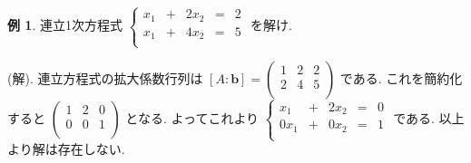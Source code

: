 \documentclass[dvipdfmx,a4paper,11pt]{article}
\theoremstyle{definition}
\newtheorem{exa}[thm]{例}
\begin{document}
\begin{exa}
連立1次方程式
 $
 \left\{ 
\begin{matrix}
x_1&+&2x_2& = &2 \\
x_1&+&4x_2& = &5\\
\end{matrix}
\right.
 $
 を解け.
 
 (解). 連立方程式の拡大係数行列は
 $[A:\bm{b}]=
  \begin{pmatrix}
 1& 2& 2  \\
 2& 4& 5  \\
 \end{pmatrix}
 $
 である. 
 これを簡約化すると
 $
  \begin{pmatrix}
 1& 2& 0  \\
 0& 0& 1 \\
 \end{pmatrix} 
 $
 となる. よってこれより
 $
  \left\{ 
\begin{matrix}
x_1&+&2x_2& = &0 \\
0x_1&+&0x_2& = &1\\
\end{matrix}
\right.
$
である. 以上より解は存在しない.
\end{exa}
\end{document}
